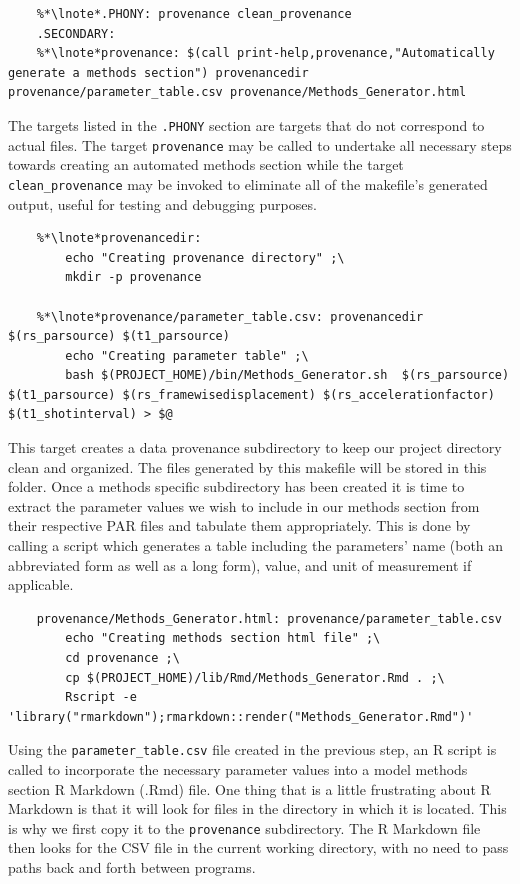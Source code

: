 \newpage

\begin{lstlisting}
	%*\lnote*.PHONY: provenance clean_provenance
	.SECONDARY:
	%*\lnote*provenance: $(call print-help,provenance,"Automatically generate a methods section") provenancedir provenance/parameter_table.csv provenance/Methods_Generator.html
\end{lstlisting}

 The targets listed in the \texttt{.PHONY} section are targets that do not correspond to actual files. The target  \texttt{provenance} may be called to undertake all necessary steps towards creating an automated methods section while the target \texttt{clean_provenance} may be invoked to eliminate all of the makefile's generated output, useful for testing and debugging purposes.

\begin{lstlisting}
	%*\lnote*provenancedir: 
		echo "Creating provenance directory" ;\
		mkdir -p provenance
		
	%*\lnote*provenance/parameter_table.csv: provenancedir $(rs_parsource) $(t1_parsource)
		echo "Creating parameter table" ;\
		bash $(PROJECT_HOME)/bin/Methods_Generator.sh  $(rs_parsource) $(t1_parsource) $(rs_framewisedisplacement) $(rs_accelerationfactor) $(t1_shotinterval) > $@
\end{lstlisting}

 This target creates a data provenance subdirectory to keep our project directory clean and organized. The files generated by this makefile will be stored in this folder.  Once a methods specific subdirectory has been created it is time to extract the parameter values we wish to include in our methods section from their respective PAR files and tabulate them appropriately. This is done by  calling a \bashn{} script which generates a table including the parameters' name (both an abbreviated form as well as a long form), value, and unit of measurement if applicable.

\begin{lstlisting}
	provenance/Methods_Generator.html: provenance/parameter_table.csv
		echo "Creating methods section html file" ;\
		cd provenance ;\
		cp $(PROJECT_HOME)/lib/Rmd/Methods_Generator.Rmd . ;\
		Rscript -e 'library("rmarkdown");rmarkdown::render("Methods_Generator.Rmd")'
\end{lstlisting}

Using the \texttt{parameter_table.csv} file created in the previous step,  an R script is called to incorporate the necessary parameter values into a model methods section R Markdown (.Rmd) file. One thing that is a little frustrating about R Markdown is that it will look for files in the directory in which it is located. This is why we first copy it to the \texttt{provenance} subdirectory. The R Markdown file then looks for the CSV file in the current working directory, with no need to pass paths back and forth between programs. 

